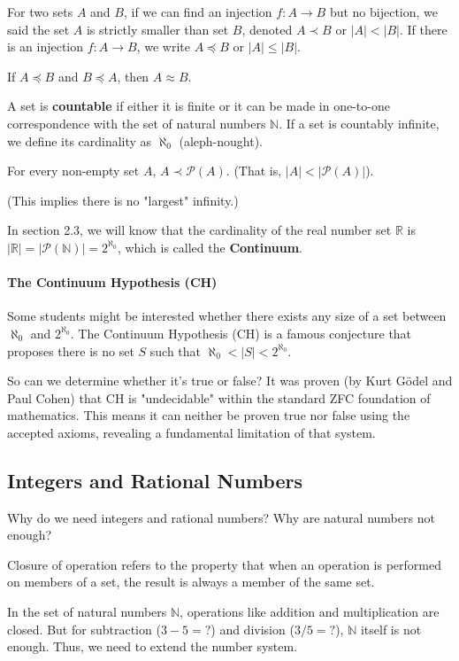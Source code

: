 \documentclass[oneside]{book}
\begin{document}
\begin{definition}
For two sets $A$ and $B$, if we can find an injection $f: A \to B$ but no bijection, we said the set $A$ is strictly smaller than set $B$, denoted $A \prec B$ or $|A| < |B|$. If there is an injection $f: A \to B$, we write $A \preceq B$ or $|A| \le |B|$.
\end{definition}

\begin{theorem}
If $A \preceq B$ and $B \preceq A$, then $A \approx B$.
\end{theorem}

\begin{definition}
A set is \textbf{countable} if either it is finite or it can be made in one-to-one correspondence with the set of natural numbers $\mathbb{N}$. If a set is countably infinite, we define its cardinality as $\aleph_0$ (aleph-nought).
\end{definition}

\begin{theorem}
For every non-empty set $A$, $A \prec \mathcal{P}(A)$. (That is, $|A| < |\mathcal{P}(A)|$).
\end{theorem}
(This implies there is no "largest" infinity.)

In section 2.3, we will know that the cardinality of the real number set $\mathbb{R}$ is $|\mathbb{R}| = |\mathcal{P}(\mathbb{N})| = 2^{\aleph_0}$, which is called the \textbf{Continuum}.

\paragraph{The Continuum Hypothesis (CH)}
Some students might be interested whether there exists any size of a set between $\aleph_0$ and $2^{\aleph_0}$. The Continuum Hypothesis (CH) is a famous conjecture that proposes there is no set $S$ such that $\aleph_0 < |S| < 2^{\aleph_0}$.

So can we determine whether it’s true or false? It was proven (by Kurt Gödel and Paul Cohen) that CH is "undecidable" within the standard ZFC foundation of mathematics. This means it can neither be proven true nor false using the accepted axioms, revealing a fundamental limitation of that system.

\subsection{Integers and Rational Numbers}
Why do we need integers and rational numbers? Why are natural numbers not enough?
\begin{definition}
Closure of operation refers to the property that when an operation is performed on members of a set, the result is always a member of the same set.
\end{definition}
In the set of natural numbers $\mathbb{N}$, operations like addition and multiplication are closed. But for subtraction ($3 - 5 = ?$) and division ($3 / 5 = ?$), $\mathbb{N}$ itself is not enough. Thus, we need to extend the number system.
\end{document}
